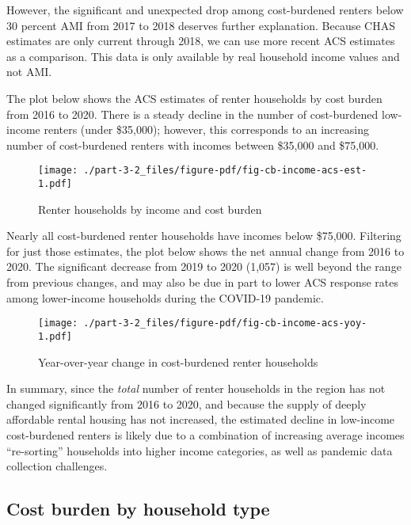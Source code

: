 \documentclass[
  letterpaper,
  DIV=11,
  numbers=noendperiod]{scrreprt}
\begin{document}
However, the significant and unexpected drop among cost-burdened renters
below 30 percent AMI from 2017 to 2018 deserves further explanation.
Because CHAS estimates are only current through 2018, we can use more
recent ACS estimates as a comparison. This data is only available by
real household income values and not AMI.

The plot below shows the ACS estimates of renter households by cost
burden from 2016 to 2020. There is a steady decline in the number of
cost-burdened low-income renters (under \$35,000); however, this
corresponds to an increasing number of cost-burdened renters with
incomes between \$35,000 and \$75,000.

\begin{figure}

{\centering \texttt{[image: ./part-3-2\_files/figure-pdf/fig-cb-income-acs-est-1.pdf]}

}

\caption{\label{fig-cb-income-acs-est}Renter households by income and
cost burden}

\end{figure}

Nearly all cost-burdened renter households have incomes below \$75,000.
Filtering for just those estimates, the plot below shows the net annual
change from 2016 to 2020. The significant decrease from 2019 to 2020
(1,057) is well beyond the range from previous changes, and may also be
due in part to lower ACS response rates among lower-income households
during the COVID-19 pandemic.

\begin{figure}

{\centering \texttt{[image: ./part-3-2\_files/figure-pdf/fig-cb-income-acs-yoy-1.pdf]}

}

\caption{\label{fig-cb-income-acs-yoy}Year-over-year change in
cost-burdened renter households}

\end{figure}

In summary, since the \emph{total} number of renter households in the
region has not changed significantly from 2016 to 2020, and because the
supply of deeply affordable rental housing has not increased, the
estimated decline in low-income cost-burdened renters is likely due to a
combination of increasing average incomes ``re-sorting'' households into
higher income categories, as well as pandemic data collection
challenges.

\hypertarget{cost-burden-by-household-type}{%
\subsection{Cost burden by household
type}\label{cost-burden-by-household-type}}
\end{document}
